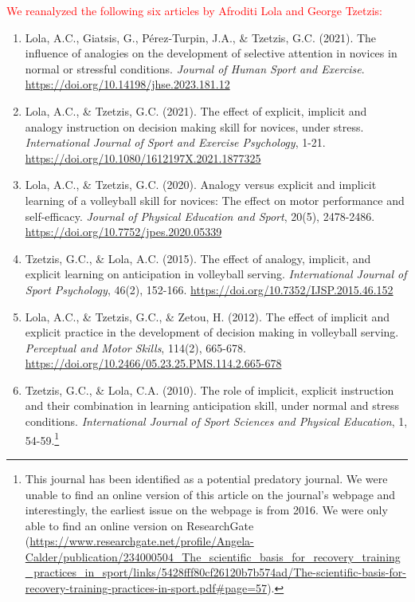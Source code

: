 \documentclass[
  english,
  man, donotrepeattitle,floatsintext]{apa7}
\begin{document}
\textcolor{red}{We reanalyzed the following six articles by Afroditi Lola and George Tzetzis:}

\begin{enumerate}
\def\labelenumi{\arabic{enumi}.}
\item
  Lola, A.C., Giatsis, G., Pérez-Turpin, J.A., \& Tzetzis, G.C. (2021). The influence of analogies on the development of selective attention in novices in normal or stressful conditions. \emph{Journal of Human Sport and Exercise}. \url{https://doi.org/10.14198/jhse.2023.181.12}
\item
  Lola, A.C., \& Tzetzis, G.C. (2021). The effect of explicit, implicit and analogy instruction on decision making skill for novices, under stress. \emph{International Journal of Sport and Exercise Psychology}, 1-21. \url{https://doi.org/10.1080/1612197X.2021.1877325}
\item
  Lola, A.C., \& Tzetzis, G.C. (2020). Analogy versus explicit and implicit learning of a volleyball skill for novices: The effect on motor performance and self-efficacy. \emph{Journal of Physical Education and Sport}, 20(5), 2478-2486. \url{https://doi.org/10.7752/jpes.2020.05339}
\item
  Tzetzis, G.C., \& Lola, A.C. (2015). The effect of analogy, implicit, and explicit learning on anticipation in volleyball serving. \emph{International Journal of Sport Psychology}, 46(2), 152-166. \url{https://doi.org/10.7352/IJSP.2015.46.152}
\item
  Lola, A.C., \& Tzetzis, G.C., \& Zetou, H. (2012). The effect of implicit and explicit practice in the development of decision making in volleyball serving. \emph{Perceptual and Motor Skills}, 114(2), 665-678. \url{https://doi.org/10.2466/05.23.25.PMS.114.2.665-678}
\item
  Tzetzis, G.C., \& Lola, C.A. (2010). The role of implicit, explicit instruction and their combination in learning anticipation skill, under normal and stress conditions. \emph{International Journal of Sport Sciences and Physical Education}, 1, 54-59.\footnote{This journal has been identified as a potential predatory journal. We were unable to find an online version of this article on the journal's webpage and interestingly, the earliest issue on the webpage is from 2016. We were only able to find an online version on ResearchGate (\url{https://www.researchgate.net/profile/Angela-Calder/publication/234000504_The_scientific_basis_for_recovery_training_practices_in_sport/links/5428fff80cf26120b7b574ad/The-scientific-basis-for-recovery-training-practices-in-sport.pdf\#page=57}).}
\end{enumerate}
\end{document}
